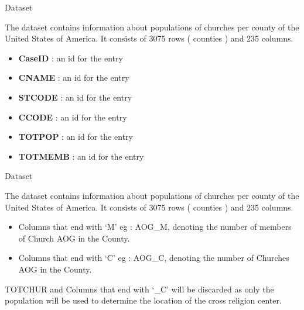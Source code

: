 \documentclass[12pt]{beamer}
\begin{document}
\begin{frame}{Dataset}

The dataset contains information about populations of churches per county of the United States of America. It consists of 3075 rows ( counties ) and 235 columns.



\begin{itemize}

  	\item  \textbf{CaseID} : an id for the entry
	\item \textbf{CNAME} : an id for the entry
	\item  \textbf{STCODE} : an id for the entry
	\item  \textbf{CCODE} : an id for the entry
	\item  \textbf{TOTPOP} : an id for the entry
	\item  \textbf{TOTMEMB} : an id for the entry

\end{itemize}
\end{frame}
\begin{frame}{Dataset}

The dataset contains information about populations of churches per county of the United States of America. It consists of 3075 rows ( counties ) and 235 columns.



\begin{itemize}


	\item  Columns that end with ‘M’ eg : AOG\_M, denoting the number of members of Church AOG in the County.
	\item  Columns that end with ‘C’ eg : AOG\_C, denoting the number of Churches AOG in the County.
\end{itemize}
TOTCHUR and Columns that end with  ‘\_C’ will be discarded as only the population will be used to determine the location of the cross religion center.




\end{frame}
\end{document}
